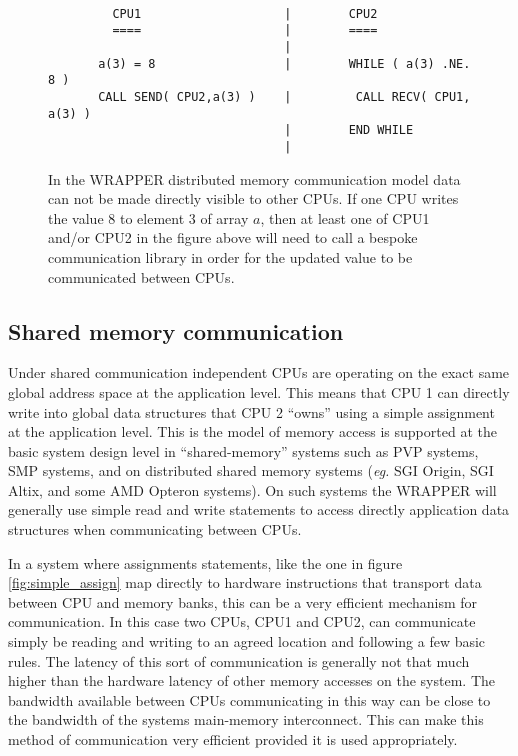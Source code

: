 \begin{figure}
\begin{verbatim}

         CPU1                    |        CPU2
         ====                    |        ====
                                 |
       a(3) = 8                  |        WHILE ( a(3) .NE. 8 )
       CALL SEND( CPU2,a(3) )    |         CALL RECV( CPU1, a(3) )
                                 |        END WHILE
                                 |
\end{verbatim}
\caption{ In the WRAPPER distributed memory communication model
data can not be made directly visible to other CPUs.
If one CPU writes the value $8$ to element $3$ of array $a$, then
at least one of CPU1 and/or CPU2 in the figure above will need
to call a bespoke communication library in order for the updated 
value to be communicated between CPUs.
} \label{fig:comm_msg}
\end{figure}

\subsection{Shared memory communication}
\label{sect:shared_memory_communication}

Under shared communication independent CPUs are operating on the
exact same global address space at the application level.  This means
that CPU 1 can directly write into global data structures that CPU 2
``owns'' using a simple assignment at the application level.  This is
the model of memory access is supported at the basic system design
level in ``shared-memory'' systems such as PVP systems, SMP systems,
and on distributed shared memory systems (\textit{eg.} SGI Origin, SGI
Altix, and some AMD Opteron systems).  On such systems the WRAPPER
will generally use simple read and write statements to access directly
application data structures when communicating between CPUs.

In a system where assignments statements, like the one in figure
\ref{fig:simple_assign} map directly to hardware instructions that
transport data between CPU and memory banks, this can be a very
efficient mechanism for communication.  In this case two CPUs, CPU1
and CPU2, can communicate simply be reading and writing to an agreed
location and following a few basic rules.  The latency of this sort of
communication is generally not that much higher than the hardware
latency of other memory accesses on the system. The bandwidth
available between CPUs communicating in this way can be close to the
bandwidth of the systems main-memory interconnect.  This can make this
method of communication very efficient provided it is used
appropriately.

